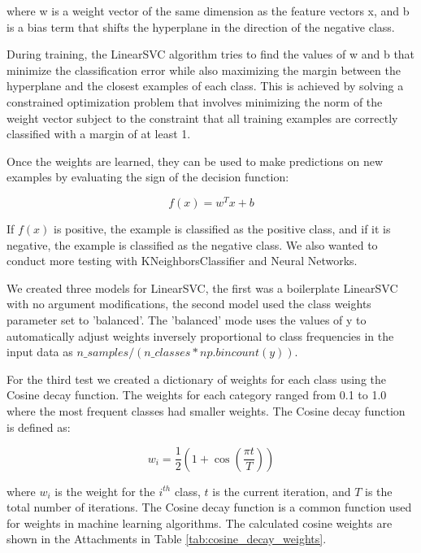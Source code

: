 where w is a weight vector of the same dimension as the feature vectors x, and b is a bias term that shifts the hyperplane in the direction of the negative class.

During training, the LinearSVC algorithm tries to find the values of w and b that minimize the classification error while also maximizing the margin between the hyperplane and the closest examples of each class. This is achieved by solving a constrained optimization problem that involves minimizing the norm of the weight vector subject to the constraint that all training examples are correctly classified with a margin of at least 1.

Once the weights are learned, they can be used to make predictions on new examples by evaluating the sign of the decision function:

\begin{equation}
f(x) = w^T x + b
\end{equation}

If $f(x)$ is positive, the example is classified as the positive class, and if it is negative, the example is classified as the negative class. We also wanted to conduct more testing with KNeighborsClassifier and Neural Networks. 

We created three models for LinearSVC, the first was a boilerplate LinearSVC with no argument modifications, the second model used the class weights parameter set to 'balanced'. The 'balanced' mode uses the values of y to automatically adjust weights inversely proportional to class frequencies in the input data as $n\_samples / (n\_classes * np.bincount(y))$. 

For the third test we created a dictionary of weights for each class using the Cosine decay function. The weights for each category ranged from 0.1 to 1.0 where the most frequent classes had smaller weights. The Cosine decay function is defined as:

\begin{equation}
    w_i = \frac{1}{2} \left(1 + \cos \left(\frac{\pi t}{T}\right)\right)
\label{eq:cosine_decay}
\end{equation}

where $w_i$ is the weight for the $i^{th}$ class, $t$ is the current iteration, and $T$ is the total number of iterations. The Cosine decay function is a common function used for weights in machine learning algorithms. The calculated cosine weights are shown in the Attachments in Table \ref{tab:cosine_decay_weights}.

